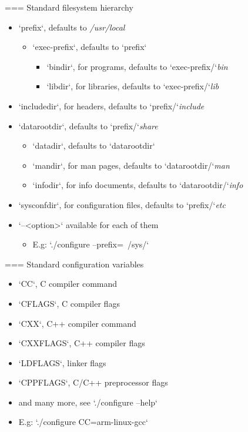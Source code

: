 === {Standard filesystem hierarchy}
  \begin{itemize}
  \item `prefix`, defaults to {\em /usr/local}
    \begin{itemize}
    \item `exec-prefix`, defaults to `prefix`
      \begin{itemize}
      \item `bindir`, for programs, defaults to `exec-prefix/`{\em bin}
      \item `libdir`, for libraries, defaults to `exec-prefix/`{\em lib}
      \end{itemize}
    \end{itemize}
  \item `includedir`, for headers, defaults to `prefix/`{\em include}
  \item `datarootdir`, defaults to `prefix/`{\em share}
    \begin{itemize}
    \item `datadir`, defaults to `datarootdir`
    \item `mandir`, for man pages, defaults to `datarootdir/`{\em man}
    \item `infodir`, for info documents, defaults to `datarootdir/`{\em info}
    \end{itemize}
  \item `sysconfdir`, for configuration files, defaults to
    `prefix/`{\em etc}
  \item `--<option>` available for each of them
    \begin{itemize}
    \item E.g: `./configure --prefix=~/sys/`
    \end{itemize}
  \end{itemize}


=== {Standard configuration variables}
  \begin{itemize}
  \item `CC`, C compiler command
  \item `CFLAGS`, C compiler flags
  \item `CXX`, C++ compiler command
  \item `CXXFLAGS`, C++ compiler flags
  \item `LDFLAGS`, linker flags
  \item `CPPFLAGS`, C/C++ preprocessor flags
  \item and many more, see `./configure --help`
  \item E.g: `./configure CC=arm-linux-gcc`
  \end{itemize}


